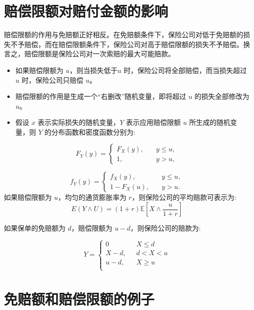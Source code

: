 \documentclass[
]{book}
\begin{document}
\hypertarget{ux8d54ux507fux9650ux989dux5bf9ux8d54ux4ed8ux91d1ux989dux7684ux5f71ux54cd}{%
\section{赔偿限额对赔付金额的影响}\label{ux8d54ux507fux9650ux989dux5bf9ux8d54ux4ed8ux91d1ux989dux7684ux5f71ux54cd}}

赔偿限额的作用与免赔额正好相反。在免赔额条件下，保险公司对低于免赔额的损失不予赔偿，而在赔偿限额条件下，保险公司对高于赔偿限额的损失不予赔偿。换言之，赔偿限额是保险公司对一次索赔的最大可能赔款。

\begin{itemize}
\item
  如果赔偿限额为 \(u\)，则当损失低于\(u\) 时，保险公司将全部赔偿，而当损失超过\(u\) 时，保险公司只赔偿 \(u\)。
\item
  赔偿限额的作用是生成一个``右删改''随机变量，即将超过 \(u\) 的损失全部修改为 \(u\)。
\item
  假设 \(x\) 表示实际损失的随机变量，\(Y\) 表示应用赔偿限额 \(u\) 所生成的随机变量，则 \(Y\) 的分布函数和密度函数分别为:
\end{itemize}

\[
F_Y(y)=\begin{cases}
F_X(y),\quad & y \le u,\\
1, \quad & y>u,
\end{cases}
\]

\[
f_Y(y)=\begin{cases}
f_X(y),\quad & y \le u,\\
1-F_X(u), \quad & y>u.
\end{cases}
\]
如果赔偿限额为 \(u\)，均匀的通货膨胀率为 \(r\)，则保险公司的平均赔款可表示为:
\[
E({Y}\wedge {U})=(1+r)\mathbb{E}[X\wedge \frac{u}{1+r}]
\]

如果保单的免赔额为 \(d\)，赔偿限额为 \(u-d\)，则保险公司的赔款为:

\[
Y=\begin{cases}
   0 \ \ \ \ \ &X\le d \\ 
  X-d,\ \ \ &d<X<u \\ 
  u-d,\ \ \ \ &X\ge u \\ 
\end{cases} 
\]

\hypertarget{ux514dux8d54ux989dux548cux8d54ux507fux9650ux989dux7684ux4f8bux5b50}{%
\section{免赔额和赔偿限额的例子}\label{ux514dux8d54ux989dux548cux8d54ux507fux9650ux989dux7684ux4f8bux5b50}}
\end{document}
